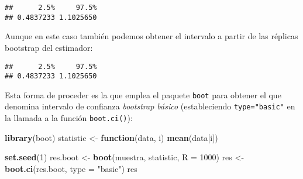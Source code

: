 \documentclass[
]{book}
\newenvironment{Shaded}{\begin{snugshade}}{\end{snugshade}}
\newcommand{\ControlFlowTok}[1]{\textcolor[rgb]{0.13,0.29,0.53}{\textbf{#1}}}
\newcommand{\DataTypeTok}[1]{\textcolor[rgb]{0.13,0.29,0.53}{#1}}
\newcommand{\DecValTok}[1]{\textcolor[rgb]{0.00,0.00,0.81}{#1}}
\newcommand{\KeywordTok}[1]{\textcolor[rgb]{0.13,0.29,0.53}{\textbf{#1}}}
\newcommand{\NormalTok}[1]{#1}
\newcommand{\OperatorTok}[1]{\textcolor[rgb]{0.81,0.36,0.00}{\textbf{#1}}}
\newcommand{\StringTok}[1]{\textcolor[rgb]{0.31,0.60,0.02}{#1}}
\theoremstyle{definition}
\theoremstyle{definition}
\theoremstyle{definition}
\theoremstyle{remark}
\begin{document}
\begin{verbatim}
##      2.5%     97.5% 
## 0.4837233 1.1025650
\end{verbatim}

Aunque en este caso también podemos obtener el intervalo a
partir de las réplicas bootstrap del estimador:

\begin{Shaded}
\end{Shaded}

\begin{verbatim}
##      2.5%     97.5% 
## 0.4837233 1.1025650
\end{verbatim}

Esta forma de proceder es la que emplea el paquete \texttt{boot} para obtener
el que denomina intervalo de confianza \emph{bootstrap básico}
(estableciendo \texttt{type="basic"} en la llamada a la función \texttt{boot.ci()}):

\begin{Shaded}
\begin{Highlighting}[]
\KeywordTok{library}\NormalTok{(boot)}
\NormalTok{statistic <-}\StringTok{ }\ControlFlowTok{function}\NormalTok{(data, i) }\KeywordTok{mean}\NormalTok{(data[i])}

\KeywordTok{set.seed}\NormalTok{(}\DecValTok{1}\NormalTok{)}
\NormalTok{res.boot <-}\StringTok{ }\KeywordTok{boot}\NormalTok{(muestra, statistic, }\DataTypeTok{R =} \DecValTok{1000}\NormalTok{)}
\NormalTok{res <-}\StringTok{ }\KeywordTok{boot.ci}\NormalTok{(res.boot, }\DataTypeTok{type =} \StringTok{"basic"}\NormalTok{)}
\NormalTok{res}
\end{Highlighting}
\end{Shaded}
\end{document}
